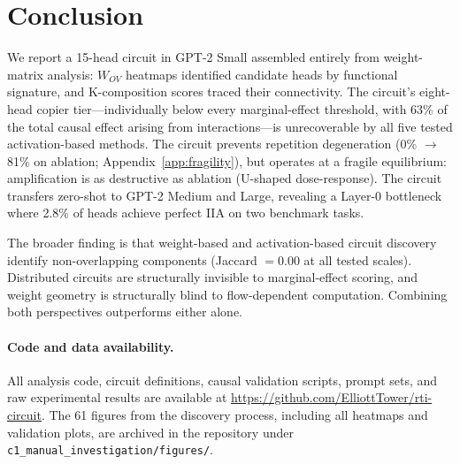 \documentclass{article}
\begin{document}
\section{Conclusion}
\label{sec:conclusion}

We report a 15-head circuit in GPT-2 Small assembled entirely from
weight-matrix analysis: $W_{OV}$ heatmaps identified candidate heads
by functional signature, and K-composition scores traced their
connectivity. The circuit's eight-head copier tier---individually
below every marginal-effect threshold, with 63\% of the total causal
effect arising from interactions---is unrecoverable by all five tested
activation-based methods. The circuit prevents repetition
degeneration (0\% $\to$ 81\% on ablation; Appendix~\ref{app:fragility}),
but operates at a fragile equilibrium: amplification is as destructive
as ablation (U-shaped dose-response). The circuit transfers zero-shot to GPT-2 Medium and
Large, revealing a Layer-0 bottleneck where 2.8\% of heads achieve
perfect IIA on two benchmark tasks.

The broader finding is that weight-based and activation-based circuit
discovery identify non-overlapping components (Jaccard $= 0.00$ at
all tested scales). Distributed circuits are structurally invisible to
marginal-effect scoring, and weight geometry is structurally blind to
flow-dependent computation. Combining both perspectives outperforms
either alone.

\paragraph{Code and data availability.}
All analysis code, circuit definitions, causal validation scripts,
prompt sets, and raw experimental results are available at
\url{https://github.com/ElliottTower/rti-circuit}.
The 61 figures from the discovery process, including all heatmaps
and validation plots, are archived in the repository under
\texttt{c1\_manual\_investigation/figures/}.




\end{document}
